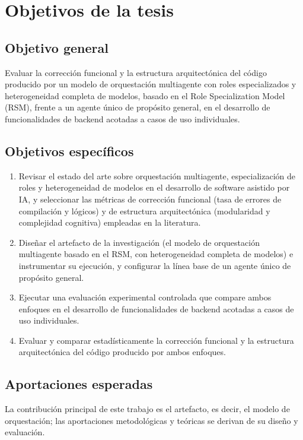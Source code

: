 \section{Objetivos de la tesis}
\label{sec:objetivos}

\subsection{Objetivo general}
Evaluar la corrección funcional y la estructura arquitectónica del código producido por un modelo de orquestación multiagente con roles especializados y heterogeneidad completa de modelos, basado en el Role Specialization Model (RSM), frente a un agente único de propósito general, en el desarrollo de funcionalidades de backend acotadas a casos de uso individuales.

\subsection{Objetivos específicos}
\begin{enumerate}[label=O\arabic*.]
  \item Revisar el estado del arte sobre orquestación multiagente, especialización de roles y heterogeneidad de modelos en el desarrollo de software asistido por IA, y seleccionar las métricas de corrección funcional (tasa de errores de compilación y lógicos) y de estructura arquitectónica (modularidad y complejidad cognitiva) empleadas en la literatura.
  \item Diseñar el artefacto de la investigación (el modelo de orquestación multiagente basado en el RSM, con heterogeneidad completa de modelos) e instrumentar su ejecución, y configurar la línea base de un agente único de propósito general.
  \item Ejecutar una evaluación experimental controlada que compare ambos enfoques en el desarrollo de funcionalidades de backend acotadas a casos de uso individuales.
  \item Evaluar y comparar estadísticamente la corrección funcional y la estructura arquitectónica del código producido por ambos enfoques.
\end{enumerate}

\subsection{Aportaciones esperadas}

La contribución principal de este trabajo es el artefacto, es decir, el modelo de orquestación; las aportaciones metodológicas y teóricas se derivan de su diseño y evaluación.


